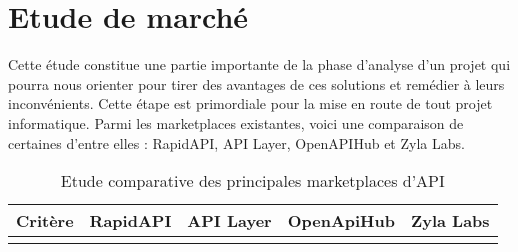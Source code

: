 \section{Etude de marché}
Cette étude constitue une partie importante de la phase d’analyse d’un projet qui pourra nous orienter pour tirer des avantages de ces solutions et remédier à leurs inconvénients. Cette étape est primordiale pour la mise en route de tout projet informatique.  Parmi les marketplaces existantes, voici une comparaison de certaines d'entre elles : RapidAPI, API Layer, OpenAPIHub et Zyla Labs. \cite[]{site1} \cite[]{site2}


\captionsetup[table]{justification=centering}

\begin{longtable}[c]{
    |>{\centering\arraybackslash}p{}
    |>{\centering\arraybackslash}p{}
    |>{\centering\arraybackslash}p{}
    |>{\centering\arraybackslash}p{}
    |>{\centering\arraybackslash}p{}|
    }
\caption{Etude comparative des principales marketplaces d’API}
\label{tab:comparaison_fournisseurs_api}                                                                                                                                                                                                                                                                                                                                                                                                                         \\
\hline
\textbf{Critère} & \textbf{RapidAPI} & \textbf{API Layer} & \textbf{OpenApiHub} & \textbf{Zyla Labs}                                                                                             \\
\hline
\endfirsthead
\hline
\endhead
\hline
\endfoot
\hline
\endlastfoot


\end{longtable}
